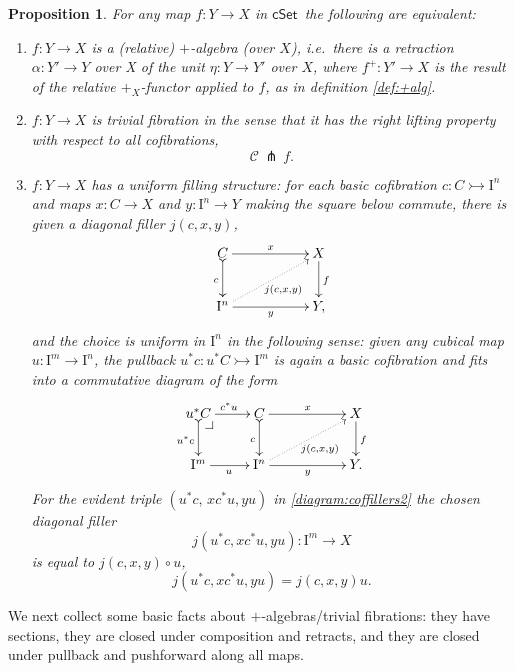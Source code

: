 \documentclass[12pt]{article}
\makeatletter
\newcommand{\cSet}{\ensuremath{\mathsf{cSet}}}
\newcommand{\pbcorner}[1][dr]{\save*!/#1-1.2pc/#1:(-1,1)@^{|-}\restore}
\newcommand{\mono}{\ensuremath{\rightarrowtail}}
\newcommand{\ra}{\ensuremath{\rightarrow}}
\newcommand{\I}{\ensuremath{\mathrm{I}}}
\newtheorem{proposition}[theorem]{Proposition}
\theoremstyle{remark}
\theoremstyle{definition}
\makeatother
\begin{document}
 \begin{proposition}\label{prop:uniformstructequivrelative} For any map $f : Y\ra X$ in \cSet\ the following are equivalent:
\begin{enumerate}
\item $f:Y\ra X$ is a \emph{(relative) $+$-algebra (over $X$)}, i.e.\ there is a retraction  $\alpha :Y' \ra Y$ over X of the unit $\eta : Y\ra Y'$ over $X$, where $f^+ : Y' \ra X$ is the result of the relative $+_X$-functor applied to $f$, as in definition \ref{def:+alg}.
\item $f:Y\ra  X$ is  \emph{trivial fibration} in the sense that it has the right lifting property with respect to all cofibrations,
\[
\mathcal{C}\, \pitchfork\,f.
\]
\item $f:Y\ra  X$ has a \emph{uniform filling structure}: 
for each basic cofibration $c : C \mono \I^{n}$ and maps $x : C\ra X$ and $y : \I^n\ra Y$ making the square below commute, there is given a diagonal filler $j(c,x,y)$,
\begin{equation}\label{diagram:coffillers}
\xymatrix{
C \ar@{>->}[d]_{c} \ar[rr]^{x} && X \ar[d]^{f} \\
\I^{n}\ar@{.>}[rru]_{j(c,x,y)} \ar[rr]_{y} && Y,
}
\end{equation}
and the choice is \emph{uniform in $\I^n$} in the following sense: given any cubical map $u : \I^m \ra \I^n$, the pullback $u^*c : u^*C\mono \I^m$ is again a basic cofibration and fits into a commutative diagram of the form
\begin{equation}\label{diagram:coffillers2}
\xymatrix{
u^*C \ar@{>->}[d]_{u^*c} \ar[r]^{c^*u} \pbcorner &  C \ar@{>->}[d]_{c} \ar[rr]^{x} && X\ar[d]^{f} \\
\I^{m} \ar[r]_{u} & \I^{n} \ar@{.>}[rru]_{j(c,x,y)} \ar[rr]_{y} && Y.
}
\end{equation}
For the evident triple $(u^*c,\, xc^*u, yu)$ in \eqref{diagram:coffillers2} the chosen diagonal filler $$j(u^*c,xc^*u,yu): \I^m \ra X$$ is equal to  $j(c,x,y)\circ u$,
\begin{equation}\label{eq:uniformfillers}
j(u^*c,xc^*u,yu) = j(c,x,y)u.
\end{equation}
\end{enumerate}
\end{proposition}

We next collect some basic facts about $+$-algebras/trivial fibrations: they have sections, they are closed under composition and retracts, and they are closed under pullback and pushforward along all maps.
\end{document}

